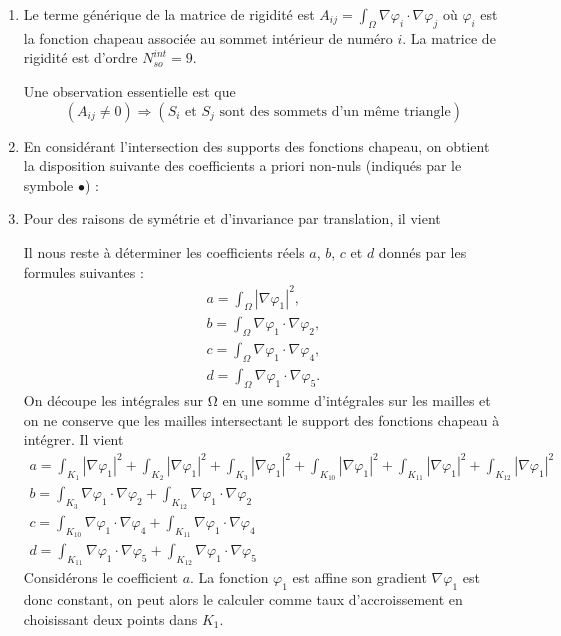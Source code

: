 \documentclass{article}
\begin{document}
\begin{enumerate}
\item Le terme générique de la matrice de rigidité est $A_{ij} =\int_{\Omega}\nabla\varphi_i\cdot\nabla\varphi_j$  où $\varphi_i$ est la fonction chapeau associée au sommet intérieur de numéro $i$. La matrice de rigidité est d'ordre $N_{so}^{int} = 9$.

Une observation essentielle est que
\[(A_{ij} \neq 0) \Longrightarrow (S_i \mbox{ et }S_j \mbox{ sont des sommets d’un même triangle})\]
\begin{center}
\end{center}
\item En considérant l'intersection des supports des fonctions chapeau, on obtient la disposition suivante des coefficients a priori non-nuls (indiqués par le symbole $\bullet$) :
\begin{center}
\end{center}
\item Pour des raisons de symétrie et d’invariance par translation, il vient
\begin{center}
\end{center}
Il nous reste à déterminer les coefficients réels $a$, $b$, $c$ et $d$ donnés par les formules suivantes :
\[\begin{array}{l}
\displaystyle a=\int_{\Omega}\left|\nabla\varphi_1\right|^2,\\
\displaystyle b=\int_{\Omega}\nabla\varphi_1\cdot\nabla\varphi_2,\\
\displaystyle c=\int_{\Omega}\nabla\varphi_1\cdot\nabla\varphi_4,\\
\displaystyle d=\int_{\Omega}\nabla\varphi_1\cdot\nabla\varphi_5.
\end{array}\]
On découpe les intégrales sur Ω en une somme d'intégrales sur les mailles et on ne conserve que les mailles intersectant le support des fonctions chapeau à intégrer. Il vient
\[\begin{array}{l}
\displaystyle a=\int_{K_1}\left|\nabla\varphi_1\right|^2+\int_{K_2}\left|\nabla\varphi_1\right|^2+\int_{K_3}\left|\nabla\varphi_1\right|^2+\int_{K_{10}}\left|\nabla\varphi_1\right|^2+\int_{K_{11}}\left|\nabla\varphi_1\right|^2+\int_{K_{12}}\left|\nabla\varphi_1\right|^2\\
\displaystyle b=\int_{K_3}\nabla\varphi_1\cdot\nabla\varphi_2+\int_{K_{12}}\nabla\varphi_1\cdot\nabla\varphi_2\\
\displaystyle c=\int_{K_{10}}\nabla\varphi_1\cdot\nabla\varphi_4+\int_{K_{11}}\nabla\varphi_1\cdot\nabla\varphi_4\\
\displaystyle d=\int_{K_{11}}\nabla\varphi_1\cdot\nabla\varphi_5+\int_{K_{12}}\nabla\varphi_1\cdot\nabla\varphi_5
\end{array}\]
Considérons le coefficient $a$. La fonction $\varphi_1$ est affine son gradient  $\nabla\varphi_1$ est donc constant, on peut alors le calculer comme taux d'accroissement en choisissant deux points dans $K_1$.



\end{enumerate}
\end{document}
